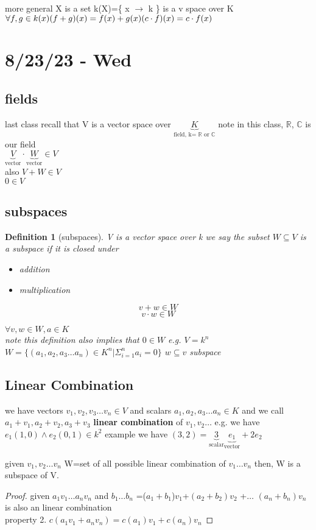 \documentclass{article}
\newtheorem*{definition}{Definition}
\newcommand{\R}{\mathbb{R}}
\newcommand{\C}{\mathbb{C}}
\newcommand{\cd}{\cdot}
\begin{document}
more general X is a set k(X)=\{ x $\to$ k \} is a v space over K
$\forall f,g \in k(x)\\(f+g)(x)=f(x)+g(x)\\ (c\cdot f)(x)=c\cdot f(x) $

\section{8/23/23 - Wed}
\subsection{fields}
last class recall that V is a vector space over $\underbrace{K}_\text{field, k= $\R$ or $\C$}$ note in this class, $\R$, $\C$ is our field 
\\
$\underbrace{V}_{\text{vector}} \cd \underbrace{W}_{\text{vector}} \in V$
\\also $V+W \in V$\\$0 \in V$
\\
\subsection{subspaces}
\begin{definition}
[subspaces]    V is a vector space over k we say the subset $W \subseteq V$ is a subspace if it is closed under
\begin{itemize}
    \item addition
    \item multiplication
\end{itemize}

    $$v+w \in W$$
    $$v \cd w \in W$$
 
 $\forall v,w \in W, a \in K$ 
 \\note this definition also implies that $0 \in W$
 e.g. $V=k^n$ $W=\{(a_1,a_2,a_3\dots a_n) \in K^n | \Sigma_{i=1}^n a_i=0\}$ $w \subseteq v $ subspace

 \end{definition}
\subsection{Linear Combination}
we have vectors $v_1,v_2,v_3 \dots v_n \in V$ and scalars $a_1,a_2,a_3\dots a_n \in K$
and we call $a_1+v_1,a_2+v_2,a_3+v_3$ \textbf{linear combination} of $v_1,v_2 \dots$
e.g. we have $ e_1(1,0) \land e_2(0,1)\in k^2$
example we have $(3,2)=
\underbrace{3}_{\text{scalar}}\underbrace{e_1}_{\text{vector}}+2e_2$
\begin{proposition}
    given $v_1,v_2 \dots v_n$ W=set of all possible linear combination of $v_1\dots v_n$ then, W is a subspace of V.
\end{proposition}
\begin{proof}
    given $a_1v_1 \dots a_nv_n$ and $b_1\dots b_n$ =($a_1+b_1$)$v_1$+$(a_2+b_2)v_2$ +$\dots$ $(a_n+b_n)v_n$ is also an linear combination\\
    property 2. $c(a_1v_1+a_nv_n)=c(a_1)v_1+c(a_n)v_n$
    
\end{proof}
\end{document}
